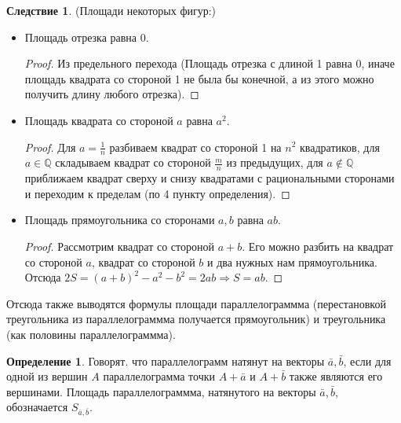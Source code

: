 \documentclass[a4paper, 12pt]{article}
\theoremstyle{definition}
\newtheorem*{definition}{Определение}
\newtheorem*{consequense}{Следствие}
\begin{document}
	\begin{consequense}(Площади некоторых фигур:)
		\begin{itemize}
			\item Площадь отрезка равна 0.
			\begin{proof}
				Из предельного перехода (Площадь отрезка с длиной 1 равна 0, иначе площадь квадрата со стороной 1 не была бы конечной, а из этого можно получить длину любого отрезка).
			\end{proof}
			\item Площадь квадрата со стороной $a$ равна $a^2$.
			\begin{proof}
				Для $a = \frac{1}{n}$ разбиваем квадрат со стороной 1 на $n^2$ квадратиков, для $a \in \mathbb{Q}$ складываем квадрат со стороной $\frac{m}{n}$ из предыдущих, для $a \notin \mathbb{Q}$ приближаем квадрат сверху и снизу квадратами с рациональными сторонами и переходим к пределам (по 4 пункту определения).
			\end{proof}
			\item Площадь прямоугольника со сторонами $a, b$ равна $ab$.
			\begin{proof}
				Рассмотрим квадрат со стороной $a+b$. Его можно разбить на квадрат со стороной $a$, квадрат со стороной $b$ и два нужных нам прямоугольника. Отсюда $2S = (a+b)^2 - a^2 -b^2 = 2ab \Rightarrow S = ab$.
			\end{proof} 
		\end{itemize}
		Отсюда также выводятся формулы площади параллелограммма (перестановкой треугольника из параллелограммма получается прямоугольник) и треугольника (как половины параллелограммма).
	\end{consequense}
	\begin{definition}
		Говорят. что параллелограмм натянут на векторы $\bar{a}, \bar{b}$, если для одной из вершин $A$ параллелограмма точки $A + \bar{a}$ и $A + \bar{b}$ также являются его вершинами. Площадь параллелограммма, натянутого на векторы $\bar{a}, \bar{b}$, обозначается $S_{\bar{a},\bar{b}}$.
	\end{definition}
\end{document}
